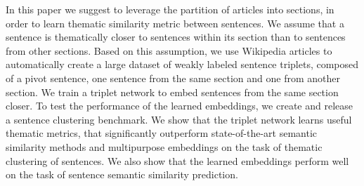 In this paper we suggest to leverage the partition of articles into sections, in order to learn thematic similarity metric between sentences. We assume that a sentence is thematically closer to sentences within its section than to sentences from other sections. Based on this assumption, we use Wikipedia articles to automatically create a large dataset of weakly labeled sentence triplets, composed of a pivot sentence, one sentence from the same section and one from another section. We train a triplet network to embed sentences from the same section closer. To test the performance of the learned embeddings, we create and release a sentence clustering benchmark. We show that the triplet network learns useful thematic metrics, that significantly outperform state-of-the-art semantic similarity methods and multipurpose embeddings on the task of thematic clustering of sentences. We also show that the learned embeddings perform well on the task of sentence semantic similarity prediction.
